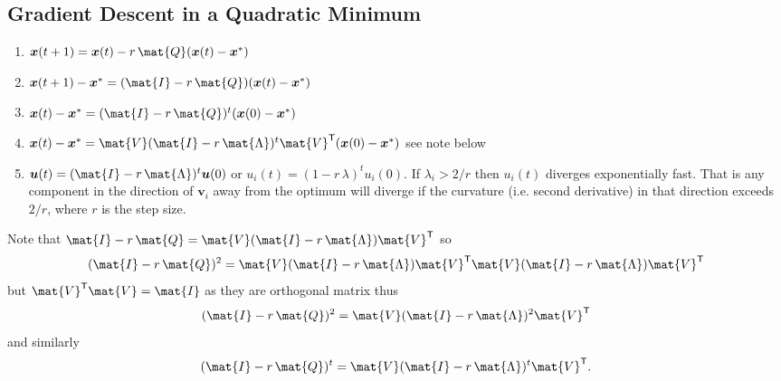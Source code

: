 \documentclass[11pt]{article}
\newcommand{\tr}{\textsf{T}}
\begin{document}
\subsection{Gradient Descent in a Quadratic Minimum}
\label{sec:org9417fa7}
\begin{enumerate}
\item \(\bm{x}(t+1) = \bm{x}(t) - r\,\mat{Q} (\bm{x}(t)-\bm{x}^{*})\)
\item \(\bm{x}(t+1) - \bm{x}^{*} = (\mat{I}- r\,\mat{Q}) (\bm{x}(t)-\bm{x}^{*})\)
\item \(\bm{x}(t) - \bm{x}^{*} = (\mat{I}- r\,\mat{Q})^t (\bm{x}(0)-\bm{x}^{*})\)
\item \(\bm{x}(t) - \bm{x}^{*} = \mat{V}(\mat{I}- r\,\mat{\Lambda})^t\mat{V}^{\tr} (\bm{x}(0)-\bm{x}^{*})\)
see note below
\item \(\bm{u}(t) = (\mat{I}-r\,\mat{\Lambda})^t \bm{u}(0)\) or 
\(u_i(t) = (1-r\,\lambda)^t u_i(0)\).  If \(\lambda_i > 2/r\) then
\(u_i(t)\) diverges exponentially fast.  That is any component in
the direction of \(\bm{v}_{i}\) away from the optimum will diverge
if the curvature (i.e. second derivative) in that direction
exceeds \(2/r\), where \(r\) is the step size.
\end{enumerate}
Note that \(\mat{I}- r\,\mat{Q} =  \mat{V}(\mat{I}-r\,\mat{\Lambda})\mat{V}^{\tr}\) so
$$ (\mat{I}- r\,\mat{Q})^2 =   \mat{V}(\mat{I}-r\,\mat{\Lambda})\mat{V}^{\tr}  \mat{V}(\mat{I}-r\,\mat{\Lambda})\mat{V}^{\tr}$$
but \(\mat{V}^{\tr} \mat{V} = \mat{I}\) as they are orthogonal matrix
thus
$$ (\mat{I}- r\,\mat{Q})^2 =   \mat{V}(\mat{I}-r\,\mat{\Lambda})^{2}\mat{V}^{\tr}$$
and similarly
$$ (\mat{I}- r\,\mat{Q})^t =   \mat{V}(\mat{I}-r\,\mat{\Lambda})^{t}\mat{V}^{\tr}.$$
\end{document}
